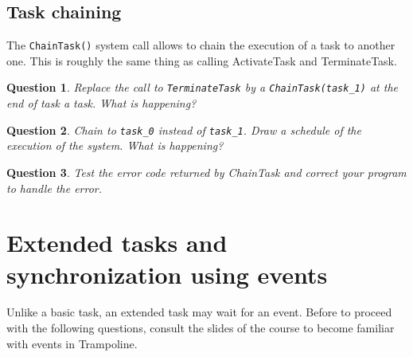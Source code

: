 \documentclass[11pt]{report}
\newtheorem{ex}{Question}
\begin{document}
\subsection{Task chaining}

The \texttt{ChainTask()} system call allows to chain the execution of a task to another one. This is roughly the same thing as calling ActivateTask and TerminateTask.

\begin{ex}
Replace the call to \texttt{TerminateTask} by a \texttt{ChainTask(task_1)} at the end of task a task. What is happening?
\end{ex}

\begin{ex}
Chain to \texttt{task_0} instead of \texttt{task_1}. Draw a schedule of the execution of the system. What is happening?
\end{ex}

\begin{ex}
Test the error code returned by ChainTask and correct your program to
handle the error.
\end{ex}

\section{Extended tasks and synchronization using events}

Unlike a basic task, an extended task may wait for an event.
Before to proceed with the following questions, consult the slides of the course to become familiar with events in Trampoline.

\end{document}

